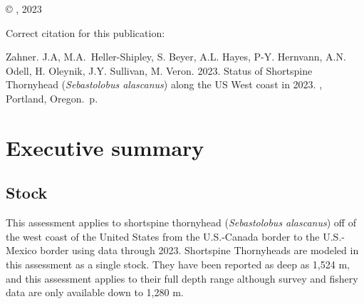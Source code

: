 \documentclass[11pt,
  english,
  letterpaper,
]{article}
\newcommand{\trTitle}{Status of Shortspine Thornyhead (\emph{Sebastolobus alascanus}) along the US West coast in 2023}
\newcommand{\trYear}{2023}
\newcommand{\trAuthsBack}{Zahner. J.A, M.A.~Heller-Shipley, S. Beyer, A.L. Hayes, P-Y. Hernvann, A.N. Odell, H. Oleynik, J.Y. Sullivan, M. Veron}
\newcommand{\trCitation}{
\begin{hangparas}{1em}{1}
\trAuthsBack{}. \trYear{}. \trTitle{}. \glsentrylong{pfmc}, Portland, Oregon. \pageref{LastPage}{}\,p.
\end{hangparas}}
\begin{document}
\thispagestyle{empty}
\vspace*{\fill}
\begin{center}
\copyright{} , \trYear{}\\
\end{center}
\par
\bigskip
\noindent
Correct citation for this publication:
\bigskip
\par
\trCitation{}
\clearpage


\tableofcontents\clearpage
\label{TRlastRoman}
\clearpage

\newpage
\thispagestyle{empty} %

\pagestyle{plain}  %
\renewcommand*{\thefootnote}{\arabic{footnote}}  %
\setcounter{footnote}{0}  %
\renewcommand{\headrulewidth}{0.5pt}
\renewcommand{\footrulewidth}{0.5pt}

\newcommand{\lt}{\ensuremath <}
\newcommand{\gt}{\ensuremath >}

\pagebreak
{}
\setcounter{page}{1}

\renewcommand{\thetable}{\roman{table}}
\renewcommand{\thefigure}{\roman{figure}}

\setlength\parskip{0.5em plus 0.1em minus 0.2em}

\hypertarget{executive-summary}{%
\section*{Executive summary}\label{executive-summary}}

\hypertarget{stock}{%
\subsection*{Stock}\label{stock}}

This assessment applies to shortspine thornyhead (\emph{Sebastolobus alascanus}) off of the west coast of the United States from the U.S.-Canada border to the U.S.-Mexico border using data through 2023. Shortspine Thornyheads are modeled in this assessment as a single stock. They have been reported as deep as 1,524 m, and this assessment applies to their full depth range although survey and fishery data are only available down to 1,280 m.
\end{document}
